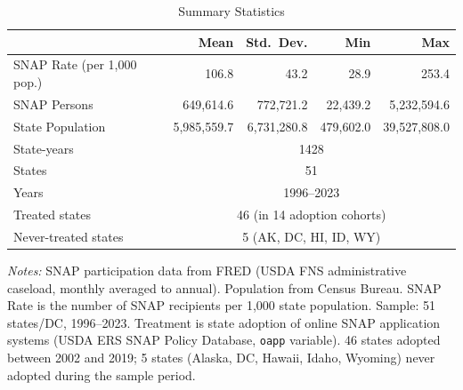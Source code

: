 \begin{table}[H]
\centering
\caption{Summary Statistics}
\label{tab:summary}
\begin{threeparttable}
\small
\begin{tabular}{lrrrr}
\toprule
 & Mean & Std.\ Dev. & Min & Max \\
\midrule
SNAP Rate (per 1,000 pop.)          & 106.8 & 43.2 & 28.9 & 253.4 \\
SNAP Persons                        & 649,614.6 & 772,721.2 & 22,439.2 & 5,232,594.6 \\
State Population                    & 5,985,559.7 & 6,731,280.8 & 479,602.0 & 39,527,808.0 \\
\midrule
State-years                         & \multicolumn{4}{c}{1428} \\
States                              & \multicolumn{4}{c}{51} \\
Years                               & \multicolumn{4}{c}{1996--2023} \\
Treated states                      & \multicolumn{4}{c}{46 (in 14 adoption cohorts)} \\
Never-treated states                & \multicolumn{4}{c}{5 (AK, DC, HI, ID, WY)} \\
\bottomrule
\end{tabular}
\begin{tablenotes}[flushleft]
\small
\item \textit{Notes:} SNAP participation data from FRED (USDA FNS administrative caseload, monthly averaged to annual). Population from Census Bureau. SNAP Rate is the number of SNAP recipients per 1,000 state population. Sample: 51 states/DC, 1996--2023. Treatment is state adoption of online SNAP application systems (USDA ERS SNAP Policy Database, \texttt{oapp} variable). 46 states adopted between 2002 and 2019; 5 states (Alaska, DC, Hawaii, Idaho, Wyoming) never adopted during the sample period.
\end{tablenotes}
\end{threeparttable}
\end{table}
